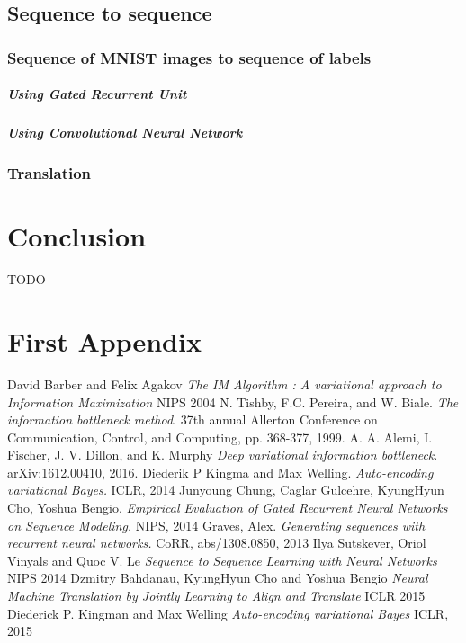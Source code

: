 \documentclass[10pt,oneside,openright]{report}
\begin{document}
\section{Sequence to sequence}
\subsection{Sequence of MNIST images to sequence of labels}
\paragraph{Using Gated Recurrent Unit}
\paragraph{Using Convolutional Neural Network}
\subsection{Translation}

\chapter{Conclusion}
TODO

\appendix
\chapter{First Appendix}

\begin{thebibliography}{9} 
David Barber and Felix Agakov
\textit{The IM Algorithm : A variational approach to Information Maximization}
NIPS 2004
N. Tishby, F.C. Pereira, and W. Biale.
\textit{The information bottleneck method}.
37th annual Allerton Conference on Communication, Control, and Computing, pp. 368-377, 1999.
A. A. Alemi, I. Fischer, J. V. Dillon, and K. Murphy
\textit{Deep variational information bottleneck}.
 arXiv:1612.00410, 2016.
 Diederik P Kingma and Max Welling.
 \textit{Auto-encoding variational Bayes.}
  ICLR, 2014
 Junyoung Chung, Caglar Gulcehre, KyungHyun Cho, Yoshua Bengio.
 \textit{Empirical Evaluation of Gated Recurrent Neural Networks on Sequence Modeling.}
  NIPS, 2014
 Graves, Alex.
 \textit{Generating sequences with recurrent neural networks.}
 CoRR, abs/1308.0850, 2013
Ilya Sutskever, Oriol Vinyals and Quoc V. Le
\textit{Sequence to Sequence Learning with Neural Networks}
NIPS 2014
Dzmitry Bahdanau, KyungHyun Cho and Yoshua Bengio
\textit{Neural Machine Translation by Jointly Learning to Align and Translate}
ICLR 2015
Diederick P. Kingman and Max Welling
\textit{Auto-encoding variational Bayes}
ICLR, 2015
\end{thebibliography}
\end{document}
